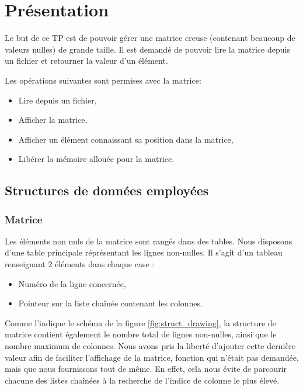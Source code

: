 \documentclass{report}
\begin{document}
  
  \tableofcontents
  \setlength{\parskip}{10pt}
  \setlength{\parindent}{0pt}
  \chapter{Présentation}
    Le but de ce TP est de pouvoir gérer une matrice creuse (contenant beaucoup de valeurs nulles) de grande taille. Il est demandé de pouvoir lire la matrice depuis un fichier et retourner la valeur d'un élément.

    Les opérations suivantes sont permises avec la matrice:
    \begin{itemize}
      \item Lire depuis un fichier,
      \item Afficher la matrice,
      \item Afficher un élément connaissant sa position dans la matrice,
      \item Libérer la mémoire allouée pour la matrice.
    \end{itemize}

    \section{Structures de données employées}
      \subsection{Matrice}
        Les éléments non nuls de la matrice sont rangés dans des tables. Nous disposons d'une table principale réprésentant les lignes non-nulles. Il s'agit d'un tableau renseignant 2 éléments dans chaque case :
        \begin{itemize}
          \item Numéro de la ligne concernée,
          \item Pointeur sur la liste chaînée contenant les colonnes.
        \end{itemize}
        Comme l'indique le schéma de la figure \ref{fig:struct_drawing}, la structure de matrice contient également le nombre total de lignes non-nulles, ainsi que le nombre maximum de colonnes. Nous avons pris la liberté d'ajouter cette dernière valeur afin de faciliter l'affichage de la matrice, fonction qui n'était pas demandée, mais que nous fournissons tout de même. En effet, cela nous évite de parcourir chacune des listes chaînées à la recherche de l'indice de colonne le plus élevé.

        
\end{document}
